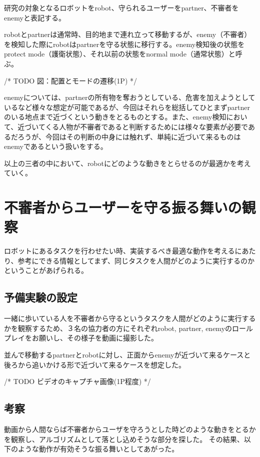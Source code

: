 \documentclass{kuisthesis}
\begin{document}
研究の対象となるロボットをrobot、守られるユーザーをpartner、不審者をenemyと表記する。

robotとpartnerは通常時、目的地まで連れ立って移動するが、enemy（不審者）を検知した際にrobotはpartnerを守る状態に移行する。enemy検知後の状態をprotect mode（護衛状態）、それ以前の状態をnormal mode（通常状態）と呼ぶ。

/* TODO 図：配置とモードの遷移(1P) */

enemyについては、partnerの所有物を奪おうとしている、危害を加えようとしているなど様々な想定が可能であるが、今回はそれらを総括してひとまずpartnerのいる地点まで近づくという動きをとるものとする。また、enemy検知において、近づいてくる人物が不審者であると判断するためには様々な要素が必要であるだろうが、今回はその判断の中身には触れず、単純に近づいて来るものはenemyであるという扱いをする。

以上の三者の中において、robotにどのような動きをとらせるのが最適かを考えていく。






\section{不審者からユーザーを守る振る舞いの観察}

ロボットにあるタスクを行わせたい時、実装するべき最適な動作を考えるにあたり、参考にできる情報としてまず、同じタスクを人間がどのように実行するのかということがあげられる。

\subsection{予備実験の設定}

一緒に歩いている人を不審者から守るというタスクを人間がどのように実行するかを観察するため、３名の協力者の方にそれぞれrobot, partner, enemyのロールプレイをお願いし、その様子を動画に撮影した。

並んで移動するpartnerとrobotに対し、正面からenemyが近づいて来るケースと後ろから追いかける形で近づいて来るケースを想定した。

/* TODO ビデオのキャプチャ画像(1P程度) */

\subsection{考察}
動画から人間ならば不審者からユーザを守ろうとした時どのような動きをとるかを観察し、アルゴリズムとして落とし込めそうな部分を探した。
その結果、以下のような動作が有効そうな振る舞いとしてあがった。
\end{document}
